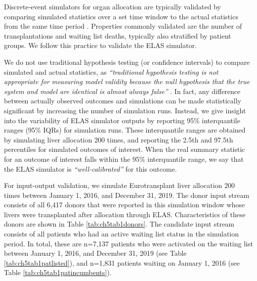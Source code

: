 \documentclass[11pt,twoside,]{book}
\begin{document}
Discrete-event simulators for organ allocation are typically validated
by comparing simulated statistics over a set time window to the actual
statistics from the same time period
\citep{ThompsonXSAM2004, shechterClinicallyBasedDiscreteEvent2005}. Properties commonly
validated are the number of transplantations and waiting list deaths,
typically also stratified by patient groups. We follow this practice to
validate the ELAS simulator.

We do not use traditional hypothesis testing (or confidence intervals) to compare
simulated and actual statistics, as
\emph{``traditional hypothesis testing is not appropriate for measuring model validity
because the null hypothesis that the true system and model are identical is almost
always false''}
\citep{shechterClinicallyBasedDiscreteEvent2005}. In fact, any difference
between actually observed outcomes and simulations can be made
statistically significant by increasing the number of simulation runs.
Instead, we give insight into the variability of ELAS simulator outputs
by reporting 95\% interquantile ranges (95\% IQRs) for simulation runs.
These interquantile ranges are obtained by simulating liver allocation
200 times, and reporting the 2.5th and 97.5th percentiles for simulated
outcomes of interest. When the real
summary statistic for an outcome of interest falls within the 95\%
interquantile range, we say that the ELAS simulator is
\emph{``well-calibrated''} for this outcome.

For input-output validation, we simulate Eurotransplant liver
allocation 200 times between January 1, 2016, and December 31, 2019.
The donor input stream consists of all 6,417 donors that were reported in this simulation window whose
livers were transplanted after allocation through ELAS. Characteristics of these
donors are shown in Table \ref{tab:ch5tab1donors}. The candidate input stream
consists of all patients who had an active waiting list status in the simulation
period. In total, these are n=7,137 patients who were activated on the waiting list between
January 1, 2016, and December 31, 2019 (see Table \ref{tab:ch5tab1patlisted}),
and n=1,831 patients waiting on January 1, 2016 (see Table \ref{tab:ch5tab1patincumbents}).
\end{document}
